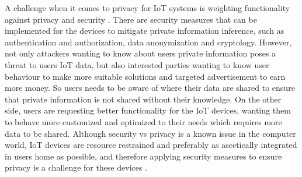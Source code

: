 A challenge when it comes to privacy for IoT systems is weighting functionality against privacy and security \cite{PrivacyIoTSurvey}. There are security measures that can be implemented for the devices to mitigate private information inference, such as authentication and authorization, data anonymization and cryptology. However, not only attackers wanting to know about users private information poses a threat to users IoT data, but also interested parties wanting to know user behaviour to make more suitable solutions and targeted advertisement to earn more money. So users needs to be aware of where their data are shared to ensure that private information is not shared without their knowledge. On the other side, users are requesting better functionality for the IoT devices, wanting them to behave more customized and optimized to their needs which requires more data to be shared. Although security vs privacy is a known issue in the computer world, IoT devices are resource restrained and preferably as ascetically integrated in users home as possible, and therefore applying security measures to ensure privacy is a challenge for these devices \cite{PrivacyIoTSurvey}. 

